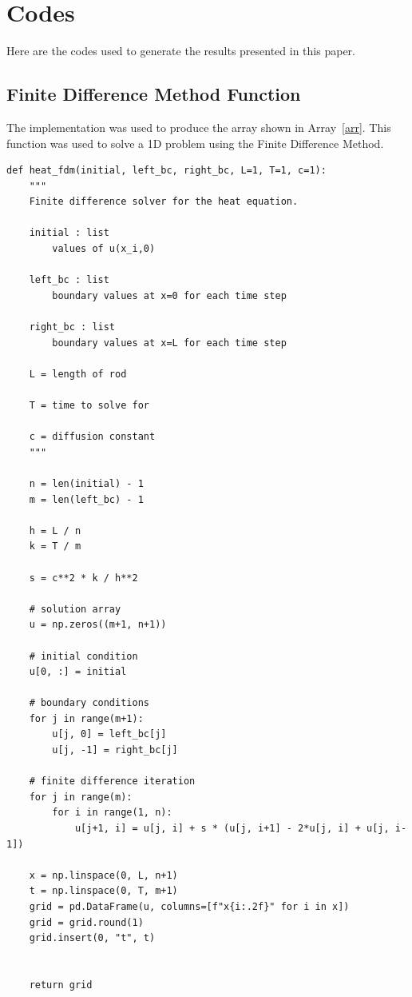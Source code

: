 \documentclass[12pt,letterpaper,reqno]{amsart}
\theoremstyle{definition}
\numberwithin{thm}{section}
\theoremstyle{remark}
\begin{document}
\section{Codes}
Here are the codes used to generate the results presented in this paper. \\

\subsection{Finite Difference Method Function}
The implementation was used to produce the array shown in Array~\ref{arr}. This function was used to solve a 1D problem using the Finite Difference Method. \\


\begin{verbatim}
def heat_fdm(initial, left_bc, right_bc, L=1, T=1, c=1):
    """ 
    Finite difference solver for the heat equation.

    initial : list
        values of u(x_i,0)

    left_bc : list
        boundary values at x=0 for each time step

    right_bc : list
        boundary values at x=L for each time step
    
    L = length of rod

    T = time to solve for

    c = diffusion constant
    """

    n = len(initial) - 1
    m = len(left_bc) - 1

    h = L / n
    k = T / m

    s = c**2 * k / h**2

    # solution array
    u = np.zeros((m+1, n+1))

    # initial condition
    u[0, :] = initial

    # boundary conditions
    for j in range(m+1):
        u[j, 0] = left_bc[j]
        u[j, -1] = right_bc[j]

    # finite difference iteration
    for j in range(m):
        for i in range(1, n):
            u[j+1, i] = u[j, i] + s * (u[j, i+1] - 2*u[j, i] + u[j, i-1])
            
    x = np.linspace(0, L, n+1)
    t = np.linspace(0, T, m+1)
    grid = pd.DataFrame(u, columns=[f"x{i:.2f}" for i in x])
    grid = grid.round(1)
    grid.insert(0, "t", t)


    return grid
\end{verbatim}
\end{document}
